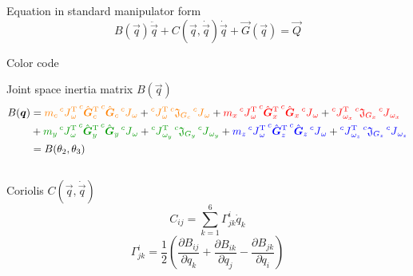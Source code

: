 \begin{frame}[shrink=30]{Equation in standard manipulator form}
  \[
  B(\vec{q}) \ddot{\vec{q}} + C(\vec{q}, \dot{\vec{q}}) \dot{\vec{q}} + \vec{G}(\vec{q}) = \vec{Q}
  \]
  
  \begin{block}{Color code}
    \centering
     $\quad$  $\quad$   $\quad$  
  \end{block}
    \begin{block}{Joint space inertia matrix $B(\vec{q})$}
    \[
    \begin{split}
      B(\vec{q}) &= \cubicFrame{m_c \prescript{c}{}{J}_{\omega}\transpose \prescript{c}{}{\unitvec{G}}_{c} \transpose  \prescript{c}{}{\unitvec{G}}_{c} \prescript{c}{}{J}_{\omega}} + \cubicFrame{\prescript{c}{}{J}_{\omega}\transpose  \prescript{c}{}{\mathfrak{J}}_{G_{c}} \prescript{c}{}{J}_{\omega}} + 
      \qx{m_x \prescript{c}{}{J}_{\omega}\transpose \prescript{c}{}{\unitvec{G}}_{x} \transpose  \prescript{c}{}{\unitvec{G}}_{x} \prescript{c}{}{J}_{\omega}} + 
      \qx{\prescript{c}{}{J}_{\omega_{x}}\transpose  \prescript{c}{}{\mathfrak{J}}_{G_{x}} \prescript{c}{}{J}_{\omega_{x}}} \\
      &+ \qy{m_y \prescript{c}{}{J}_{\omega}\transpose \prescript{c}{}{\unitvec{G}}_{y} \transpose  \prescript{c}{}{\unitvec{G}}_{y} \prescript{c}{}{J}_{\omega}} + 
      \qy{\prescript{c}{}{J}_{\omega_{y}}\transpose  \prescript{c}{}{\mathfrak{J}}_{G_{y}} \prescript{c}{}{J}_{\omega_{y}}} 
      + \qz{m_z \prescript{c}{}{J}_{\omega}\transpose \prescript{c}{}{\unitvec{G}}_{z} \transpose  \prescript{c}{}{\unitvec{G}}_{z} \prescript{c}{}{J}_{\omega}} + \qz{\prescript{c}{}{J}_{\omega_{z}}\transpose  \prescript{c}{}{\mathfrak{J}}_{G_{z}} \prescript{c}{}{J}_{\omega_{z}}}\\
      & = B(\theta_2, \theta_3)
    \end{split}
    \]
  \end{block}
  \begin{columns}
    \begin{column}{0.5\textwidth}
      \begin{block}{Coriolis $C(\vec{q}, \dot{\vec{q}})$}
        \[
        C_{ij} = \sum_{k=1}^6{\Gamma^i_{jk} \dot{q}_k}
        \]
        \[
        \Gamma^i_{jk} = \frac{1}{2} \left ( \frac{\partial B_{ij}}{\partial q_k}
        + \frac{\partial B_{ik}}{\partial q_j}
        - \frac{\partial B_{jk}}{\partial q_i}\right)
        \]
      \end{block}

\end{column}
\end{columns}
\end{frame}
